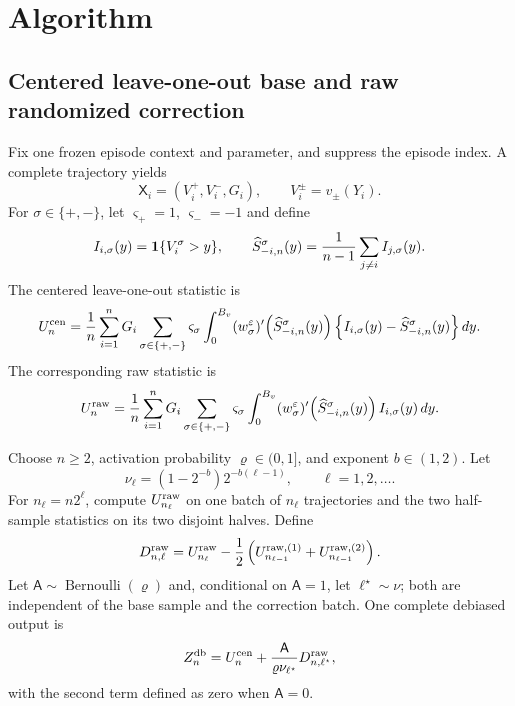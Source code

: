 \section{Algorithm}\label{sec:algorithm}

\subsection{Centered leave-one-out base and raw randomized correction}

Fix one frozen episode context and parameter, and suppress the episode index.  A complete trajectory yields
\begin{equation}\label{eq:trajectory-summary}
 \mathsf X_i=(V_i^+,V_i^-,G_i),
 \qquad
 V_i^\pm=v_\pm(Y_i).
\end{equation}
For $\sigma\in\{+,-\}$, let $\varsigma_+=1$, $\varsigma_-=-1$ and define
\begin{equation}\label{eq:loo-survival}
 I_{i,\sigma}(y)=\mathbf 1\{V_i^\sigma>y\},
 \qquad
 \widehat S_{-i,n}^\sigma(y)
 =\frac1{n-1}\sum_{j\ne i}I_{j,\sigma}(y).
\end{equation}
The centered leave-one-out statistic is
\begin{equation}\label{eq:centered-loo}
 U_n^{\rm cen}
 =\frac1n\sum_{i=1}^{n}G_i
 \sum_{\sigma\in\{+,-\}}\varsigma_\sigma
 \int_0^{B_v}
 (w_\sigma^\varepsilon)'\!\left(\widehat S_{-i,n}^\sigma(y)\right)
 \left\{I_{i,\sigma}(y)-\widehat S_{-i,n}^\sigma(y)\right\}dy.
\end{equation}
The corresponding raw statistic is
\begin{equation}\label{eq:raw-loo}
 U_n^{\rm raw}
 =\frac1n\sum_{i=1}^{n}G_i
 \sum_{\sigma\in\{+,-\}}\varsigma_\sigma
 \int_0^{B_v}
 (w_\sigma^\varepsilon)'\!\left(\widehat S_{-i,n}^\sigma(y)\right)
 I_{i,\sigma}(y)\,dy.
\end{equation}

Choose $n\ge2$, activation probability $\varrho\in(0,1]$, and exponent $b\in(1,2)$.  Let
\begin{equation}\label{eq:level-probabilities}
 \nu_\ell=(1-2^{-b})2^{-b(\ell-1)},
 \qquad \ell=1,2,\ldots.
\end{equation}
For $n_\ell=n2^\ell$, compute $U_{n_\ell}^{\rm raw}$ on one batch of $n_\ell$ trajectories and the two half-sample statistics on its two disjoint halves.  Define
\begin{equation}\label{eq:raw-level-difference}
 D_{n,\ell}^{\rm raw}
 =U_{n_\ell}^{\rm raw}
 -\frac12\left(
 U_{n_{\ell-1}}^{\rm raw,(1)}
 +U_{n_{\ell-1}}^{\rm raw,(2)}
 \right).
\end{equation}
Let $\mathsf A\sim\operatorname{Bernoulli}(\varrho)$ and, conditional on $\mathsf A=1$, let $\ell^\star\sim\nu$; both are independent of the base sample and the correction batch.  One complete debiased output is
\begin{equation}\label{eq:debiased-output}
 Z_n^{\mathrm{db}}
 =U_n^{\rm cen}
 +\frac{\mathsf A}{\varrho\nu_{\ell^\star}}D_{n,\ell^\star}^{\rm raw},
\end{equation}
with the second term defined as zero when $\mathsf A=0$.

